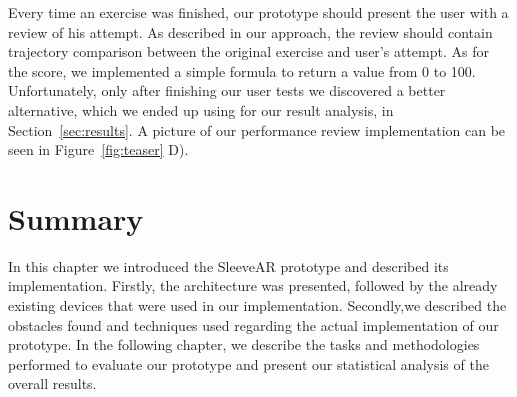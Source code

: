 Every time an exercise was finished, our prototype should present the user with a review of his attempt. 
As described in our approach, the review should contain trajectory comparison between the original exercise and user's attempt.
As for the score, we implemented a simple formula to return a value from 0 to 100.
Unfortunately, only after finishing our user tests we discovered a better alternative, which we ended up using for our result analysis, in Section~\ref{sec:results}.
A picture of our performance review implementation can be seen in Figure~\ref{fig:teaser} D). 



\section{Summary}
In this chapter we introduced the SleeveAR prototype and described its implementation. Firstly, the architecture was presented, followed by the already existing devices that were used in our implementation. Secondly,we described the obstacles found and techniques used regarding the actual implementation of our prototype. In the following chapter, we describe the tasks and methodologies performed to evaluate our prototype and present our statistical analysis of the overall results.